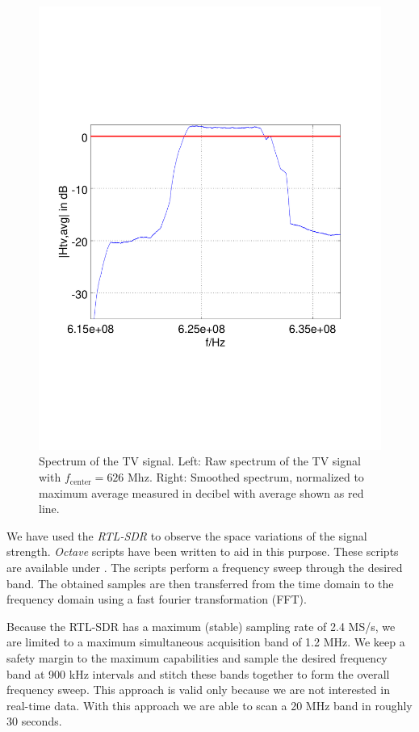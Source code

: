 \documentclass[conference]{IEEEtran}
\begin{document}
\begin{figure}[h]
\begin{minipage}{0.49\columnwidth}
	\includegraphics[width=\columnwidth]{./fig/626mhz_filtered}
	\end{minipage}
	\caption{Spectrum of the TV signal. Left: Raw spectrum of the TV signal with \ensuremath{f_{\text{center}}=\text{626 Mhz}}. Right: Smoothed spectrum, normalized to maximum average measured in decibel with average shown as red line.}
	\label{fig:tv_record} 
\end{figure}

We have used the \textit{RTL-SDR} to observe the space variations of the
signal strength. \textit{Octave} scripts have been written to aid in
this purpose. These scripts are available under \cite{s3xm3x_RTLSDRSpecAn}. The scripts perform a
frequency sweep through the desired band. The obtained samples are then
transferred from the time domain to the frequency domain using a fast
fourier transformation (FFT). 

Because the RTL-SDR has a maximum (stable) sampling rate of 2.4 MS/s, we are
limited to a maximum simultaneous acquisition band of 1.2 MHz. We keep a safety
margin to the maximum capabilities and sample the desired frequency band at 900
kHz intervals and stitch these bands together to form the overall frequency
sweep. This approach is valid only because we are not interested in real-time
data.  With this approach we are able to scan a 20 MHz band in roughly 30
seconds.
\end{document}

